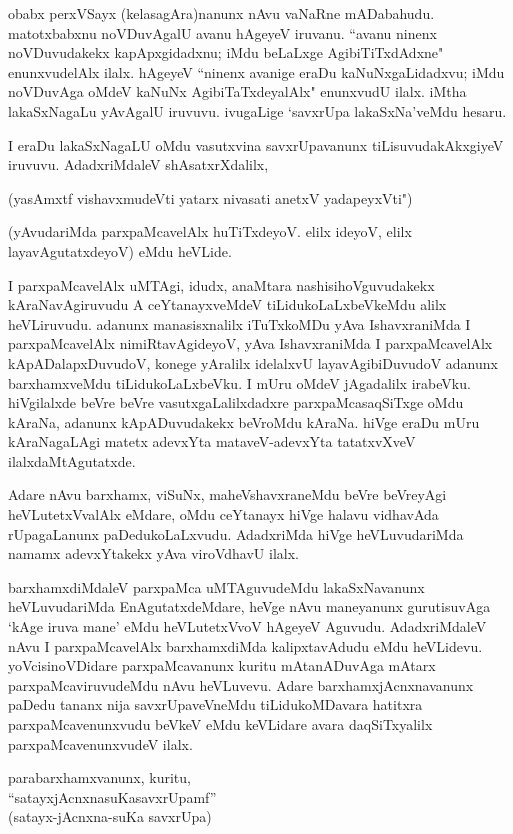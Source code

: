 obabx perxVSayx (kelasagAra)nanunx nAvu vaNaRne mADabahudu. matotxbabxnu noVDuvAgalU avanu hAgeyeV iruvanu. ``avanu ninenx noVDuvudakekx kapApxgidadxnu; iMdu beLaLxge AgibiTiTxdAdxne" enunxvudelAlx ilalx. hAgeyeV ``ninenx avanige eraDu kaNuNxgaLidadxvu; iMdu noVDuvAga oMdeV kaNuNx AgibiTaTxdeyalAlx" enunxvudU ilalx. iMtha lakaSxNagaLu yAvAgalU iruvuvu. ivugaLige `savxrUpa lakaSxNa'veMdu hesaru.

I eraDu lakaSxNagaLU oMdu vasutxvina savxrUpavanunx tiLisuvudakAkxgiyeV iruvuvu. AdadxriMdaleV shAsatxrXdalilx,

\begin{shloka}
(yasAmxtf vishavxmudeVti yatarx nivasati anetxV yadapeyxVti")
\end{shloka}

(yAvudariMda parxpaMcavelAlx huTiTxdeyoV. elilx ideyoV, elilx layavAgutatxdeyoV) eMdu heVLide.

I parxpaMcavelAlx uMTAgi, idudx, anaMtara nashisihoVguvudakekx kAraNavAgiruvudu A ceYtanayxveMdeV tiLidukoLaLxbeVkeMdu alilx heVLiruvudu. adanunx manasisxnalilx iTuTxkoMDu yAva IshavxraniMda I parxpaMcavelAlx nimiRtavAgideyoV, yAva IshavxraniMda I parxpaMcavelAlx kApADalapxDuvudoV, konege yAralilx idelalxvU layavAgibiDuvudoV adanunx barxhamxveMdu tiLidukoLaLxbeVku. I mUru oMdeV jAgadalilx irabeVku. hiVgilalxde beVre beVre vasutxgaLalilxdadxre parxpaMcasaqSiTxge oMdu kAraNa, adanunx kApADuvudakekx beVroMdu kAraNa. hiVge eraDu mUru kAraNagaLAgi matetx adevxYta mataveV-adevxYta tatatxvXveV ilalxdaMtAgutatxde. 

Adare nAvu barxhamx, viSuNx, maheVshavxraneMdu beVre beVreyAgi heVLutetxVvalAlx eMdare, oMdu ceYtanayx hiVge halavu vidhavAda rUpagaLanunx paDedukoLaLxvudu. AdadxriMda hiVge heVLuvudariMda namamx adevxYtakekx yAva viroVdhavU ilalx. 

barxhamxdiMdaleV parxpaMca uMTAguvudeMdu lakaSxNavanunx heVLuvudariMda EnAgutatxdeMdare, heVge nAvu maneyanunx gurutisuvAga `kAge iruva mane' eMdu heVLutetxVvoV hAgeyeV Aguvudu. AdadxriMdaleV nAvu I parxpaMcavelAlx barxhamxdiMda kalipxtavAdudu eMdu heVLidevu. yoVcisinoVDidare parxpaMcavanunx kuritu mAtanADuvAga mAtarx parxpaMcaviruvudeMdu nAvu heVLuvevu. Adare barxhamxjAcnxnavanunx paDedu tananx nija savxrUpaveVneMdu tiLidukoMDavara hatitxra parxpaMcavenunxvudu beVkeV eMdu keVLidare avara daqSiTxyalilx parxpaMcavenunxvudeV ilalx.

\begin{shloka}
parabarxhamxvanunx, kuritu, \\
``satayxjAcnxnasuKasavxrUpamf''\\
(satayx-jAcnxna-suKa savxrUpa)
\end{shloka}

